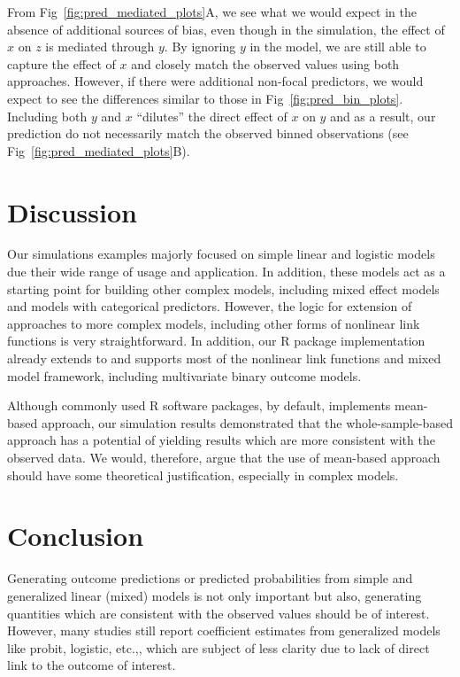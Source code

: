 \documentclass[10pt,letterpaper]{article}
\let\proglang=\textsf
\begin{document}
From Fig~\ref{fig:pred_mediated_plots}A, we see what we would expect in the absence of additional sources of bias, even though in the simulation, the effect of $x$ on $z$ is mediated through $y$. By ignoring $y$ in the model, we are still able to capture the effect of $x$ and closely match the observed values using both approaches. However, if there were additional non-focal predictors, we would expect to see the differences similar to those in Fig~\ref{fig:pred_bin_plots}. Including both $y$ and $x$ ``dilutes'' the direct effect of $x$ on $y$ and as a result, our prediction do not necessarily match the observed binned observations (see Fig~\ref{fig:pred_mediated_plots}B).

\section*{Discussion}

Our simulations examples majorly focused on simple linear and logistic models due their wide range of usage and application. In addition, these models act as a starting point for building other complex models, including mixed effect models and models with categorical predictors. However, the logic for extension of approaches to more complex models, including other forms of nonlinear link functions is very straightforward. In addition, our \proglang{R} package implementation already extends to and supports most of the nonlinear link functions and mixed model framework, including multivariate binary outcome models.

Although commonly used \proglang{R} software packages, by default, implements mean-based approach, our simulation results demonstrated that the whole-sample-based approach has a potential of yielding results which are more consistent with the observed data. We would, therefore, argue that the use of mean-based approach should have some theoretical justification, especially in complex models. 

\section*{Conclusion}

Generating outcome predictions or predicted probabilities from simple and generalized linear (mixed) models is not only important but also, generating quantities which are consistent with the observed values should be of interest. However, many studies still report coefficient estimates from generalized models like probit, logistic, etc.,\cite{hanmer2013behind}, which are subject of less clarity due to lack of direct link to the outcome of interest.
\end{document}

